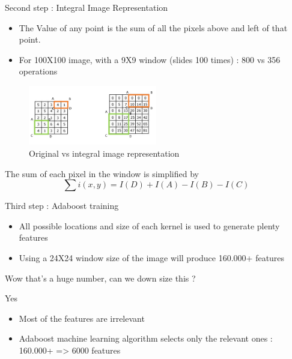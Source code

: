 \documentclass[tikz,table,border=2mm]{beamer}
\begin{document}
\begin{frame}{Second step : Integral Image Representation}

\begin{itemize}
	\item The Value of any point is the sum of all the pixels above and left of that point.
	\item For 100X100 image, with a 9X9 window (slides 100 times) : 800 vs 356 operations
\end{itemize}
\begin{figure}[ht]
    \centering
    \includegraphics[width=0.5\textwidth]{images/integ_2.png}
    \caption{Original vs integral image representation}
\end{figure}
\begin{block}{The sum of each pixel in the window is simplified by}
\begin{equation}
\sum i(x,y) = I(D) + I(A) - I(B) -I(C)
\end{equation}
\end{block}
\end{frame}

\begin{frame}{Third step : Adaboost training}

\begin{itemize}
	\item All possible locations and size of each kernel is used to generate plenty features
	\item Using a 24X24 window size of the image will produce 160.000+ features
\end{itemize}
Wow that's a huge number, can we down size this ?
\begin{block}{Yes}
\begin{itemize}
  \item Most of the features are irrelevant
  \item Adaboost machine learning algorithm selects only the relevant ones : 160.000+ => 6000 features
\end{itemize}
\end{block}
\end{frame}
\end{document}
